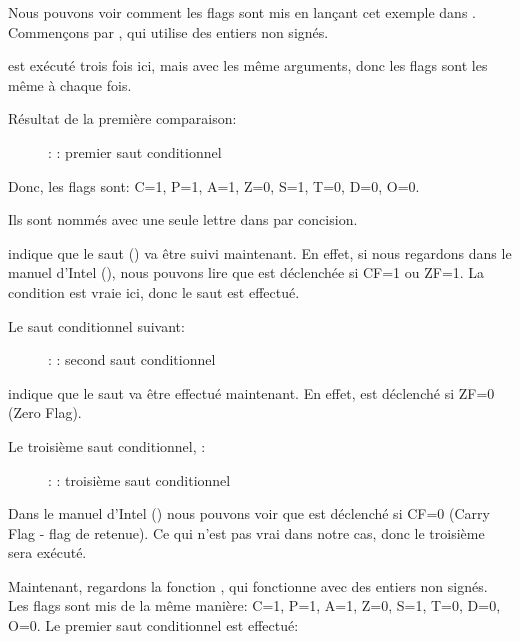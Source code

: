 \clearpage
{}
\myindex{\olly}

Nous pouvons voir comment les flags sont mis en lançant cet exemple dans \olly.
Commençons par , qui utilise des entiers non signés.

\CMP est exécuté trois fois ici, mais avec les même arguments, donc les flags
sont les même à chaque fois.

Résultat de la première comparaison:

\begin{figure}[H]
\centering
{}
\caption{\olly: : premier saut conditionnel}
\label{fig:jcc_olly_unsigned_1}
\end{figure}

Donc, les flags sont: C=1, P=1, A=1, Z=0, S=1, T=0, D=0, O=0.

Ils sont nommés avec une seule lettre dans \olly par concision.

\olly indique que le saut (\JBE) va être suivi maintenant.
En effet, si nous regardons dans le manuel d'Intel (), nous pouvons
lire que \JBE est déclenchée si CF=1 ou ZF=1.
La condition est vraie ici, donc le saut est effectué.

\clearpage
Le saut conditionnel suivant:

\begin{figure}[H]
\centering
{}
\caption{\olly: : second saut conditionnel}
\label{fig:jcc_olly_unsigned_2}
\end{figure}

\olly indique que le saut \JNZ va être effectué maintenant.
En effet, \JNZ est déclenché si ZF=0 (Zero Flag).

\clearpage
Le troisième saut conditionnel, \JNB:

\begin{figure}[H]
\centering
{}
\caption{\olly: : troisième saut conditionnel}
\label{fig:jcc_olly_unsigned_3}
\end{figure}

Dans le manuel d'Intel () nous pouvons voir que \JNB est déclenché
si CF=0 (Carry Flag - flag de retenue).
Ce qui n'est pas vrai dans notre cas, donc le troisième \printf sera exécuté.

\clearpage
Maintenant, regardons la fonction , qui fonctionne avec des entiers
non signés.
Les flags sont mis de la même manière: C=1, P=1, A=1, Z=0, S=1, T=0, D=0, O=0.
Le premier saut conditionnel \JLE est effectué:

